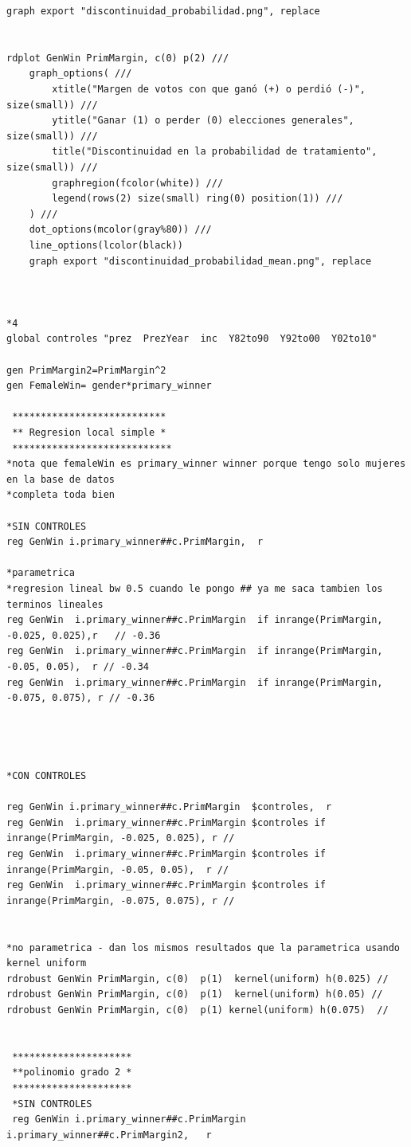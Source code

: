 \documentclass[a4paper, answers, addpoints, 11pt]{exam}
\begin{document}
\begin{verbatim}
graph export "discontinuidad_probabilidad.png", replace


rdplot GenWin PrimMargin, c(0) p(2) ///
    graph_options( ///
        xtitle("Margen de votos con que ganó (+) o perdió (-)", size(small)) ///
        ytitle("Ganar (1) o perder (0) elecciones generales", size(small)) ///
        title("Discontinuidad en la probabilidad de tratamiento", size(small)) ///
        graphregion(fcolor(white)) ///
        legend(rows(2) size(small) ring(0) position(1)) ///
    ) ///
    dot_options(mcolor(gray%80)) ///
    line_options(lcolor(black))
	graph export "discontinuidad_probabilidad_mean.png", replace


	
*4	
global controles "prez  PrezYear  inc  Y82to90  Y92to00  Y02to10"

gen PrimMargin2=PrimMargin^2
gen FemaleWin= gender*primary_winner
 
 ***************************
 ** Regresion local simple *
 ****************************
*nota que femaleWin es primary_winner winner porque tengo solo mujeres en la base de datos
*completa toda bien

*SIN CONTROLES
reg GenWin i.primary_winner##c.PrimMargin,  r

*parametrica
*regresion lineal bw 0.5 cuando le pongo ## ya me saca tambien los terminos lineales
reg GenWin  i.primary_winner##c.PrimMargin  if inrange(PrimMargin, -0.025, 0.025),r   // -0.36
reg GenWin  i.primary_winner##c.PrimMargin  if inrange(PrimMargin, -0.05, 0.05),  r // -0.34
reg GenWin  i.primary_winner##c.PrimMargin  if inrange(PrimMargin, -0.075, 0.075), r // -0.36




*CON CONTROLES

reg GenWin i.primary_winner##c.PrimMargin  $controles,  r
reg GenWin  i.primary_winner##c.PrimMargin $controles if inrange(PrimMargin, -0.025, 0.025), r //  
reg GenWin  i.primary_winner##c.PrimMargin $controles if inrange(PrimMargin, -0.05, 0.05),  r //  
reg GenWin  i.primary_winner##c.PrimMargin $controles if inrange(PrimMargin, -0.075, 0.075), r //  


*no parametrica - dan los mismos resultados que la parametrica usando kernel uniform
rdrobust GenWin PrimMargin, c(0)  p(1)  kernel(uniform) h(0.025) // 
rdrobust GenWin PrimMargin, c(0)  p(1)  kernel(uniform) h(0.05) // 
rdrobust GenWin PrimMargin, c(0)  p(1) kernel(uniform) h(0.075)  // 


 *********************
 **polinomio grado 2 *
 *********************
 *SIN CONTROLES
 reg GenWin i.primary_winner##c.PrimMargin i.primary_winner##c.PrimMargin2,   r
 

\end{verbatim}
\end{document}
